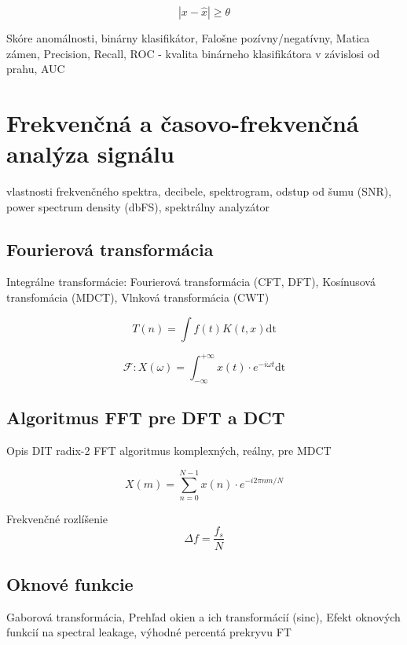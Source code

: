 \cite{review-outlier-datection} \cite{anomaly-detection-algorithms} \cite{outlier-analysis}
\begin{equation}
|x - \hat{x}| \geq \theta 
\end{equation}

Skóre anomálnosti, 	binárny klasifikátor, Falošne pozívny/negatívny, Matica zámen, Precision, Recall, 
ROC - kvalita binárneho klasifikátora v závislosi od prahu, AUC

\section{Frekvenčná a časovo-frekvenčná analýza signálu}
vlastnosti frekvenčného spektra, decibele, spektrogram, odstup od šumu (SNR), power spectrum density (dbFS), spektrálny analyzátor 

\subsection{Fourierová transformácia}
Integrálne transformácie: Fourierová transformácia (CFT, DFT), Kosínusová transfomácia (MDCT), Vlnková transformácia (CWT) \cite{dct} \cite{casove-frekvencia-analyza-signalu}

\begin{equation}
T(n) = \int{f(t) K(t,x) \mathrm{dt}}
\end{equation}

\begin{equation}
\mathcal{F}: X(\omega) = \int_{-\infty}^{+\infty}{x(t) \cdot e^{-i\omega t} \mathrm{dt}}
\end{equation}

\subsection{Algoritmus FFT pre DFT a DCT}
Opis DIT radix-2 FFT algoritmus komplexných, reálny, pre MDCT \cite{fft-blackbox}

\begin{equation}
X(m) = \sum_{n = 0}^{N-1}{x(n) \cdot e^{-i2\pi n m / N}}
\end{equation}

Frekvenčné rozlíšenie
\begin{equation}
\Delta f = \frac{f_s}{N}
\end{equation}

\subsection{Oknové funkcie}
Gaborová transformácia, Prehľad okien a ich transformácií (sinc), Efekt oknových funkcií na spectral leakage, výhodné percentá prekryvu FT 	\cite{understanding-dsp} \cite{signal-processing} \cite{spectral-density-estimation}

